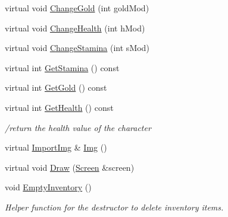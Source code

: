 \begin{DoxyCompactItemize}
\item 
virtual void \hyperlink{classCharacter_a5d8e04c875df744a3ea1ca426f8c0e12}{Change\-Gold} (int gold\-Mod)
\item 
virtual void \hyperlink{classCharacter_af0c41714e3a2cb65268fa721846a4939}{Change\-Health} (int h\-Mod)
\item 
virtual void \hyperlink{classCharacter_a50324e5ccb52512dfc69b3775d85c3dc}{Change\-Stamina} (int s\-Mod)
\item 
virtual int \hyperlink{classCharacter_aa443cb1d657be7a60225e02f46210c0d}{Get\-Stamina} () const 
\item 
virtual int \hyperlink{classCharacter_a85ce5d70120b39b72363ce9901e3ce70}{Get\-Gold} () const 
\item 
virtual int \hyperlink{classCharacter_a0e4d78d1bdebed299d4caa36f2d70209}{Get\-Health} () const 
\begin{DoxyCompactList}\small\item\em /return the health value of the character \end{DoxyCompactList}\item 
virtual \hyperlink{classImportImg}{Import\-Img} \& \hyperlink{classCharacter_a49cd0fdb0fc9e0f824aa54909ca86b2b}{Img} ()
\item 
virtual void \hyperlink{classCharacter_a2194329f9956a07b9e3dc021da93358e}{Draw} (\hyperlink{classScreen}{Screen} \&screen)
\item 
void \hyperlink{classCharacter_a0a69dd77da3407e50adc18e04cf2023b}{Empty\-Inventory} ()
\begin{DoxyCompactList}\small\item\em Helper function for the destructor to delete inventory items. \end{DoxyCompactList}\end{DoxyCompactItemize}
